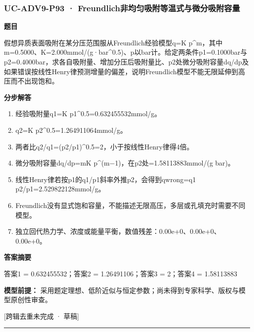 \documentclass[UTF8,11pt,a4paper]{ctexart}
\begin{document}
\subsubsection*{UC-ADV9-P93 · Freundlich非均匀吸附等温式与微分吸附容量}
\noindent\textbf{题目}\par
假想异质表面吸附在某分压范围服从Freundlich经验模型q=K p\textasciicircum{}m，其中m=0.5000、K=2.000mmol/(g·bar\textasciicircum{}0.5)、p以bar计。给定两条件p1=0.1000bar与p2=0.4000bar，求各自吸附量、增加分压后吸附量比、p2处微分吸附容量dq/dp及如果错误按线性Henry律预测增量的偏差，说明Freundlich模型不能无限延伸到高压而不出现饱和。\par
\medskip\noindent\textbf{分步解答}
\begin{enumerate}
\item 经验吸附量q1=K p1\textasciicircum{}0.5=0.632455532mmol/g。
\item q2=K p2\textasciicircum{}0.5=1.264911064mmol/g。
\item 两者比q2/q1=(p2/p1)\textasciicircum{}0.5=2，小于按线性Henry律得4倍。
\item 微分吸附容量dq/dp=mK p\textasciicircum{}(m−1)，在p2处=1.58113883mmol/(g bar)。
\item 线性Henry律若按p1的q1/p1斜率外推p2，会得到qwrong=q1 p2/p1=2.529822128mmol/g。
\item Freundlich没有显式饱和容量，不能描述无限高压，多层或孔填充时需要不同模型。
\item 独立回代热力学、浓度或能量平衡，数值残差：0.00e+0、0.00e+0、0.00e+0。
\end{enumerate}
\noindent\textbf{答案摘要}\par
答案1 = 0.632455532；答案2 = 1.26491106；答案3 = 2；答案4 = 1.58113883\par
\noindent\textbf{模型前提：}
采用题定理想、低阶近似与恒定参数；尚未得到专家科学、版权与模型原创性审查。\par
\noindent\textcolor{red!65!black}{[跨辑去重未完成 · 草稿]} \par
\medskip\hrule\medskip
{}
\end{document}
